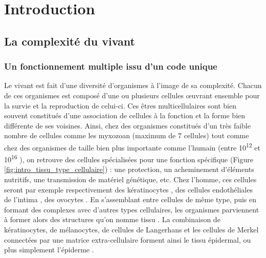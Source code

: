 \setcounter{chapter}{1}         %
\setcounter{section}{0}
\chapter*{Introduction}         %
\label{chapter:intro}
\graphicspath{ {./img/intro} }





\section{La complexité du vivant}

\subsection{Un fonctionnement multiple issu d'un code unique}

Le vivant est fait d'une diversité d'organismes à l'image de sa complexité. Chacun de ces organismes est composé d'une ou plusieurs cellules œuvrant ensemble pour la survie et la reproduction de celui-ci. Ces êtres multicellulaires sont bien souvent constitués d’une association de cellules à la fonction et la forme bien différente de ses voisines. Ainsi, chez des organismes constitués d'un très faible nombre de cellules comme les myxozoan (maximum de 7 cellules) \cite{Morris2010Aug} tout comme chez des organismes de taille bien plus importante comme l'humain (entre 10\textsuperscript{12} et 10\textsuperscript{16} \cite{Bianconi2013}), on retrouve des cellules spécialisées pour une fonction spécifique \cite{Panina2020Sep} (Figure \ref{fig:intro_tissu_type_cellulaire}) : une protection, un acheminement d'éléments nutritifs, une transmission de matériel génétique, etc. Chez l’homme, ces cellules seront par exemple respectivement des kératinocytes \cite{Yuki2007Apr}, des cellules endothéliales de l’intima \cite{Yuan1991Aug}, des ovocytes \cite{Trounson2013}. En s’assemblant entre cellules de même type, puis en formant des complexes avec d’autres types cellulaires, les organismes parviennent à former alors des structures qu’on nomme tissu \cite{Hekselman2020Mar}. La combinaison de kératinocytes, de mélanocytes, de cellules de Langerhans et les cellules de Merkel connectées par une matrice extra-cellulaire forment ainsi le tissu épidermal, ou plus simplement l’épiderme \cite{Bettley1965}.

